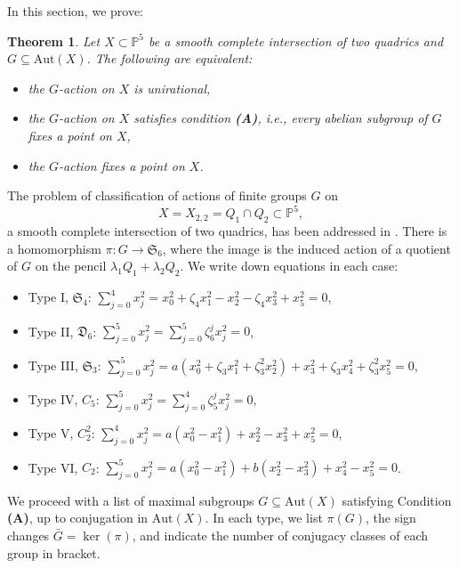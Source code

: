 \documentclass[12pt,reqno]{amsart}
\theoremstyle{plain}
\newtheorem{theo}[prop]{Theorem}
\theoremstyle{remark}
\theoremstyle{definition}
\numberwithin{equation}{section}
\def\fD{{\mathfrak D}}
\def\fS{{\mathfrak S}}
\def\fS{{\mathfrak S}}
\def\bP{{\mathbb P}}
\def\Aut{\mathrm{Aut}}
\begin{document}
In this section, we prove:

\begin{theo}
\label{thm:2-2}
    Let $X\subset \bP^5$ be a smooth complete intersection of two quadrics and $G\subseteq \Aut(X)$. The following are equivalent: 
    \begin{itemize}
     \item the $G$-action on $X$ is unirational,
        \item the $G$-action on $X$ satisfies condition {\bf (A)}, i.e., every abelian subgroup of $G$ fixes a point on $X$,
          \item the $G$-action fixes a point on $X$.
    \end{itemize}
\end{theo}


The problem of classification of actions of finite groups $G$ on 
$$
X=X_{2,2}=Q_1\cap Q_2\subset \bP^5,
$$
a smooth complete intersection of two quadrics, has been addressed in \cite{avilov}. There is a homomorphism $\pi: G\to \fS_6$, where the image is the induced action of a quotient of $G$ on the pencil $\lambda_1Q_1+\lambda_2Q_2$.  We write down equations in each case:  

\begin{itemize}
    \item Type I, $\fS_4$: $\sum_{j=0}^4x_j^2 =x_0^2+\zeta_4x_1^2-x_2^2-\zeta_4x_3^2+x_5^2= 0$,
    \item Type II, $\fD_6$: $\sum_{j=0}^5x_j^2 =\sum_{j=0}^5\zeta_{6}^{j}x_j^2= 0 $,
      \item Type III, $\fS_3$: $\sum_{j=0}^5x_j^2 =a(x_0^2+\zeta_3x_1^2+\zeta_3^2x_2^2)+x_3^2+\zeta_3x_4^2+\zeta_3^2x_5^2=0$,
       \item Type IV, $C_5$: $\sum_{j=0}^5x_j^2 =\sum_{j=0}^4\zeta_5^{j}x_j^2=0$,
      \item Type V, $C_2^2$: $\sum_{j=0}^4x_j^2 =a(x_0^2-x_1^2)+x_2^2-x_3^2+x_5^2=0$,
      \item Type VI, $C_2$: $\sum_{j=0}^5x_j^2 =a(x_0^2-x_1^2)+b(x_2^2-x_3^2)+x_4^2-x_5^2=0$.
\end{itemize}


We proceed with a list of maximal subgroups $G\subseteq \Aut(X)$ satisfying Condition {\bf (A)}, up to conjugation in $\Aut(X)$. In each type, we list $\pi(G)$, the sign changes $\bar G=\ker(\pi)$, and indicate the number of conjugacy classes of each group in bracket.
\end{document}
